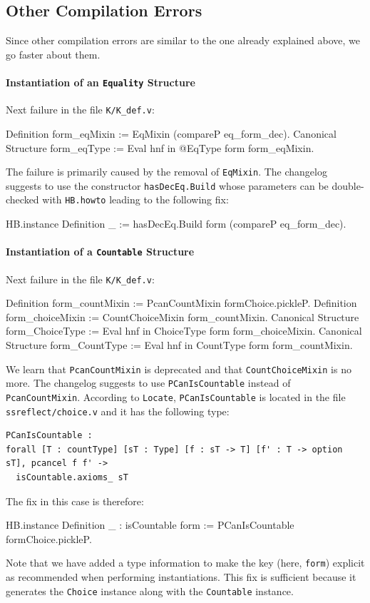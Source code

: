 \documentclass{article}
\def\coqin#1{\texttt{#1}}
\begin{document}
\subsection{Other Compilation Errors}
\label{sec:other}

Since other compilation errors are similar to the one already explained above, we go faster about them.

\paragraph{Instantiation of an \coqin{Equality} Structure}

Next failure in the file \coqin{K/K_def.v}:
\begin{failure}
Definition form_eqMixin := EqMixin (compareP eq_form_dec).
Canonical Structure form_eqType := Eval hnf in @EqType form form_eqMixin.
\end{failure}
The failure is primarily caused by the removal of \coqin{EqMixin}. The changelog
suggests to use the constructor \coqin{hasDecEq.Build} whose parameters
can be double-checked with \coqin{HB.howto} leading to the following fix:
\begin{success}
HB.instance Definition _ := hasDecEq.Build form (compareP eq_form_dec).  
\end{success}

\paragraph{Instantiation of a \coqin{Countable} Structure}

Next failure in the file \coqin{K/K_def.v}:
\begin{failure}
Definition form_countMixin := PcanCountMixin formChoice.pickleP.
Definition form_choiceMixin := CountChoiceMixin form_countMixin.
Canonical Structure form_ChoiceType := Eval hnf in ChoiceType form form_choiceMixin.
Canonical Structure form_CountType := Eval hnf in CountType form form_countMixin.  
\end{failure}
We learn that \coqin{PcanCountMixin} is deprecated and that
\coqin{CountChoiceMixin} is no more. The changelog suggests to use
\coqin{PCanIsCountable} instead of \coqin{PcanCountMixin}.  According
to \coqin{Locate}, \coqin{PCanIsCountable} is located in the file
\coqin{ssreflect/choice.v} and it has the following type:
\begin{verbatim}
PCanIsCountable :
forall [T : countType] [sT : Type] [f : sT -> T] [f' : T -> option sT], pcancel f f' ->
  isCountable.axioms_ sT
\end{verbatim}
The fix in this case is therefore:
\begin{success}
HB.instance Definition _ : isCountable form := PCanIsCountable formChoice.pickleP.  
\end{success}
Note that we have added a type information to make the key (here,
\coqin{form}) explicit as recommended when performing instantiations.
This fix is sufficient because it generates the \coqin{Choice} instance
along with the \coqin{Countable} instance.
\end{document}
